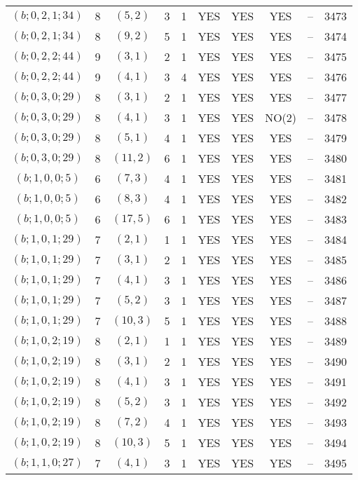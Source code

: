 \begin{longtable}{|c|c|c|c|c|c|c|c|c|c|}
$(b; 0, 2, 1; 34)$ & 8 & $(5, 2)$ & 3 & 1 & YES & YES & YES & -- & 3473\\
$(b; 0, 2, 1; 34)$ & 8 & $(9, 2)$ & 5 & 1 & YES & YES & YES & -- & 3474\\
$(b; 0, 2, 2; 44)$ & 9 & $(3, 1)$ & 2 & 1 & YES & YES & YES & -- & 3475\\
$(b; 0, 2, 2; 44)$ & 9 & $(4, 1)$ & 3 & 4 & YES & YES & YES & -- & 3476\\
$(b; 0, 3, 0; 29)$ & 8 & $(3, 1)$ & 2 & 1 & YES & YES & YES & -- & 3477\\
$(b; 0, 3, 0; 29)$ & 8 & $(4, 1)$ & 3 & 1 & YES & YES & NO(2) & -- & 3478\\
$(b; 0, 3, 0; 29)$ & 8 & $(5, 1)$ & 4 & 1 & YES & YES & YES & -- & 3479\\
$(b; 0, 3, 0; 29)$ & 8 & $(11, 2)$ & 6 & 1 & YES & YES & YES & -- & 3480\\
$(b; 1, 0, 0; 5)$ & 6 & $(7, 3)$ & 4 & 1 & YES & YES & YES & -- & 3481\\
$(b; 1, 0, 0; 5)$ & 6 & $(8, 3)$ & 4 & 1 & YES & YES & YES & -- & 3482\\
$(b; 1, 0, 0; 5)$ & 6 & $(17, 5)$ & 6 & 1 & YES & YES & YES & -- & 3483\\
$(b; 1, 0, 1; 29)$ & 7 & $(2, 1)$ & 1 & 1 & YES & YES & YES & -- & 3484\\
$(b; 1, 0, 1; 29)$ & 7 & $(3, 1)$ & 2 & 1 & YES & YES & YES & -- & 3485\\
$(b; 1, 0, 1; 29)$ & 7 & $(4, 1)$ & 3 & 1 & YES & YES & YES & -- & 3486\\
$(b; 1, 0, 1; 29)$ & 7 & $(5, 2)$ & 3 & 1 & YES & YES & YES & -- & 3487\\
$(b; 1, 0, 1; 29)$ & 7 & $(10, 3)$ & 5 & 1 & YES & YES & YES & -- & 3488\\
$(b; 1, 0, 2; 19)$ & 8 & $(2, 1)$ & 1 & 1 & YES & YES & YES & -- & 3489\\
$(b; 1, 0, 2; 19)$ & 8 & $(3, 1)$ & 2 & 1 & YES & YES & YES & -- & 3490\\
$(b; 1, 0, 2; 19)$ & 8 & $(4, 1)$ & 3 & 1 & YES & YES & YES & -- & 3491\\
$(b; 1, 0, 2; 19)$ & 8 & $(5, 2)$ & 3 & 1 & YES & YES & YES & -- & 3492\\
$(b; 1, 0, 2; 19)$ & 8 & $(7, 2)$ & 4 & 1 & YES & YES & YES & -- & 3493\\
$(b; 1, 0, 2; 19)$ & 8 & $(10, 3)$ & 5 & 1 & YES & YES & YES & -- & 3494\\
$(b; 1, 1, 0; 27)$ & 7 & $(4, 1)$ & 3 & 1 & YES & YES & YES & -- & 3495\\

\end{longtable}
